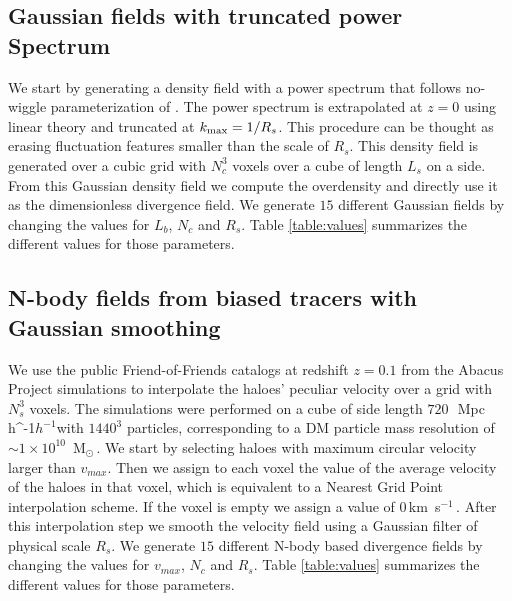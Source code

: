 \documentclass[usenatbib]{mnras}
\newcommand{\Msun}{\,{\rm M}$_{\odot}$\,}
\newcommand{\Mpch}{\,{\rm Mpc}\,\ifmmode h^{-1}\else $h^{-1}$\fi}
\newcommand{\kms}{\,{\rm km}\ s$^{-1}$\,}
\begin{document}
\subsection{Gaussian fields with truncated power Spectrum}

We start by generating a density field with a power spectrum that follows no-wiggle parameterization of \cite{1998ApJ...496..605E}.
The power spectrum is extrapolated at $z=0$ using linear theory and truncated at $k_{\rm max}=1/R_s$.
This procedure can be thought as erasing fluctuation features smaller than the scale of $R_s$.
This density field is generated over a cubic grid with $N_c^3$ voxels over a cube of length $L_s$ on a side.
From this Gaussian density field we compute  the overdensity and directly use it as the dimensionless divergence field.
We generate $15$ different Gaussian fields by changing the values for $L_b$, $N_c$ and $R_s$. 
Table \ref{table:values} summarizes the different values for those parameters.

\subsection{N-body fields from biased tracers with Gaussian smoothing}

We use the public Friend-of-Friends catalogs at redshift $z=0.1$
from the Abacus Project simulations \citep{2018ApJS..236...43G} to interpolate the haloes' peculiar velocity over a grid with $N_s^3$ voxels.
The simulations were performed on a cube of side length $720$\ \Mpch with
$1440^3$ particles, corresponding to a DM particle mass resolution of $\sim 1 \times 10^{10}$ \Msun.
We start by selecting haloes with maximum circular velocity larger
than $v_{max}$.
Then we assign to each voxel the value of the average velocity of the haloes in that voxel, which is equivalent to a Nearest Grid Point interpolation scheme. 
If the voxel is empty we assign a value of $0$\kms.
After this interpolation step we smooth the velocity field using a Gaussian filter of physical scale $R_s$.
We generate $15$ different N-body based divergence fields by changing the values for $v_{max}$, $N_c$ and $R_s$. 
Table \ref{table:values} summarizes the different values for those parameters.
\end{document}
